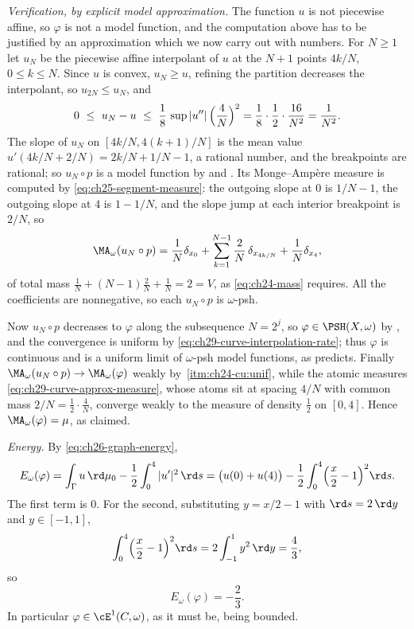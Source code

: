 \begin{example}
\emph{Verification, by explicit model approximation.}  The function \(u\) is
not piecewise affine, so \(\varphi\) is not a model function, and the
computation above has to be justified by an approximation which we now carry
out with numbers.  For \(N\geq1\) let \(u_N\) be the piecewise affine
interpolant of \(u\) at the \(N+1\) points \(4k/N\), \(0\leq k\leq N\).
Since \(u\) is convex, \(u_N\geq u\), refining the partition decreases the
interpolant, so \(u_{2N}\leq u_N\), and
\begin{equation}
\label{eq:ch29-curve-interpolation-rate}
 0\ \leq\ u_N-u\ \leq\ \frac18\,\sup|u''|\,\Bigl(\frac4N\Bigr)^2
 =\frac18\cdot\frac12\cdot\frac{16}{N^2}=\frac1{N^2}.
\end{equation}
The slope of \(u_N\) on \([4k/N,4(k+1)/N]\) is the mean value
\(u'(4k/N+2/N)=2k/N+1/N-1\), a rational number, and the breakpoints are
rational; so \(u_N\circ p\) is a model function by
 and
.  Its Monge--Amp\`ere measure is computed by
\eqref{eq:ch25-segment-measure}: the outgoing slope at \(0\) is
\(1/N-1\), the outgoing slope at \(4\) is \(1-1/N\), and the slope jump at
each interior breakpoint is \(2/N\), so
\begin{equation}
\label{eq:ch29-curve-approx-measure}
 \MA_\omega(u_N\circ p)
 =\frac1N\delta_{x_0}
  +\sum_{k=1}^{N-1}\frac2N\,\delta_{x_{4k/N}}
  +\frac1N\delta_{x_4},
\end{equation}
of total mass \(\tfrac1N+(N-1)\tfrac2N+\tfrac1N=2=V\), as
\eqref{eq:ch24-mass} requires.  All the coefficients are nonnegative, so
each \(u_N\circ p\) is \(\omega\)-psh.

Now \(u_N\circ p\) decreases to \(\varphi\) along the subsequence
\(N=2^j\), so \(\varphi\in\PSH(X,\omega)\) by
, and the convergence is uniform by
\eqref{eq:ch29-curve-interpolation-rate}; thus \(\varphi\) is continuous and
is a uniform limit of \(\omega\)-psh model functions, as
 predicts.  Finally
\(\MA_\omega(u_N\circ p)\to\MA_\omega(\varphi)\) weakly by
\,\cref{itm:ch24-cu:unif}, while the
atomic measures \eqref{eq:ch29-curve-approx-measure}, whose atoms sit at
spacing \(4/N\) with common mass \(2/N=\tfrac12\cdot\tfrac4N\), converge
weakly to the measure of density \(\tfrac12\) on \([0,4]\).  Hence
\(\MA_\omega(\varphi)=\mu\), as claimed.

\emph{Energy.}  By \eqref{eq:ch26-graph-energy},
\[
 E_\omega(\varphi)
 =\int_\Gamma u\,\rd\mu_0-\frac12\int_0^4|u'|^2\,\rd s
 =\bigl(u(0)+u(4)\bigr)
  -\frac12\int_0^4\Bigl(\frac x2-1\Bigr)^2\rd s .
\]
The first term is \(0\).  For the second, substituting \(y=x/2-1\) with
\(\rd s=2\,\rd y\) and \(y\in[-1,1]\),
\[
 \int_0^4\Bigl(\frac x2-1\Bigr)^2\rd s=2\int_{-1}^1y^2\,\rd y=\frac43 ,
\]
so
\begin{equation}
\label{eq:ch29-curve-energy}
 E_\omega(\varphi)=-\frac23 .
\end{equation}
In particular \(\varphi\in\cE^1(C,\omega)\), as it must be, being bounded.


\end{example}
